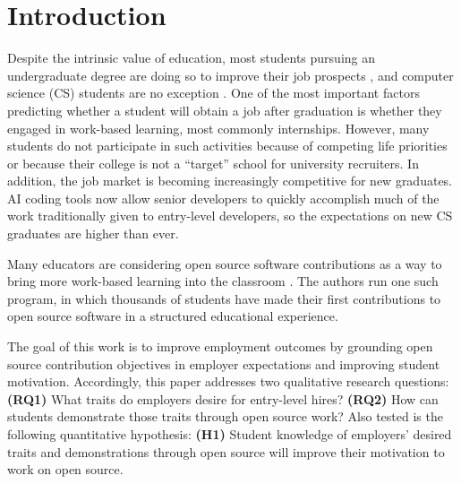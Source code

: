\section{Introduction}

Despite the intrinsic value of education, most students pursuing an undergraduate degree are doing so to improve their job prospects \citep{gedyeStudentsUndergraduateExpectations2004,nortonPerceivedBenefitsUndergraduate2017}, and computer science (CS) students are no exception \citep{helpsStudentExpectationsComputing2005,alshahraniUsingSocialCognitive2018}. One of the most important factors predicting whether a student will obtain a job after graduation is whether they engaged in work-based learning, most commonly internships. However, many students do not participate in such activities because of competing life priorities or because their college is not a ``target'' school for university recruiters. In addition, the job market is becoming increasingly competitive for new graduates. AI coding tools now allow senior developers to quickly accomplish much of the work traditionally given to entry-level developers, so the expectations on new CS graduates are higher than ever.

Many educators are considering open source software contributions as a way to bring more work-based learning into the classroom \citep[e.g.,][]{nascimentoUsingOpenSource2013,hangIndustryMentoringInternship2024,marmorsteinOpenSourceContribution2011,mullerEngagingStudentsOpen2019,choiOpenSourceSoftware2021}. The authors run one such program, in which thousands of students have made their first contributions to open source software in a structured educational experience.

The goal of this work is to improve employment outcomes by grounding open source contribution objectives in employer expectations and improving student motivation. Accordingly, this paper addresses two qualitative research questions: \textbf{(RQ1)} What traits do employers desire for entry-level hires? \textbf{(RQ2)} How can students demonstrate those traits through open source work?
Also tested is the following quantitative hypothesis: \textbf{(H1)} Student knowledge of employers' desired traits and demonstrations through open source will improve their motivation to work on open source.